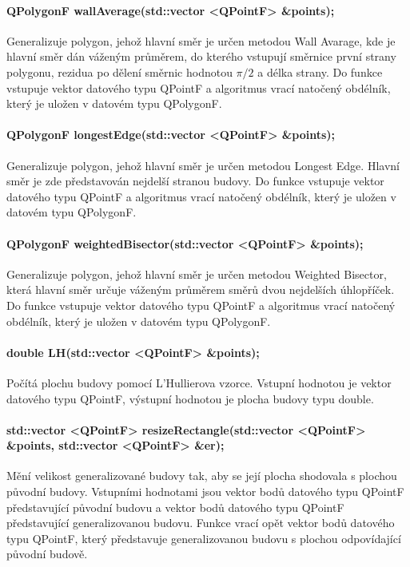 \documentclass[11pt]{article}
\begin{document}
 	\paragraph{QPolygonF wallAverage(std::vector <QPointF> \&points);}
 	Generalizuje polygon, jehož hlavní směr je určen metodou Wall Avarage, kde je hlavní směr dán váženým průměrem, do kterého vstupují směrnice první strany polygonu, rezidua po dělení směrnic hodnotou $\pi/2$ a délka strany. Do funkce vstupuje vektor datového typu QPointF a algoritmus vrací natočený obdélník, který je uložen v datovém typu QPolygonF.
 	
 	\paragraph{QPolygonF longestEdge(std::vector <QPointF> \&points);}
 	Generalizuje polygon, jehož hlavní směr je určen metodou Longest Edge. Hlavní směr je zde představován nejdelší stranou budovy. Do funkce vstupuje vektor datového typu QPointF a algoritmus vrací natočený obdélník, který je uložen v datovém typu QPolygonF.
 	
 	\paragraph{QPolygonF weightedBisector(std::vector <QPointF> \&points);}
 	Generalizuje polygon, jehož hlavní směr je určen metodou Weighted Bisector, která hlavní směr určuje váženým průměrem směrů dvou nejdelších úhlopříček. Do funkce vstupuje vektor datového typu QPointF a algoritmus vrací natočený obdélník, který je uložen v datovém typu QPolygonF.
 	
 	\paragraph{double LH(std::vector <QPointF> \&points);}
 	Počítá plochu budovy pomocí L'Hullierova vzorce. Vstupní hodnotou je vektor datového typu QPoi\-ntF, výstupní hodnotou je plocha budovy typu double.
 	
 	\paragraph{std::vector <QPointF> resizeRectangle(std::vector <QPointF> \&points, \newline std::vector <QPointF> \&er);}
 	Mění velikost generalizované budovy tak, aby se její plocha shodovala s plochou původní budovy. Vstupními hodnotami jsou vektor bodů datového typu QPointF představující původní budovu a vektor bodů datového typu QPointF představující generalizovanou budovu. Funkce vrací opět vektor bodů datového typu QPointF, který představuje generalizovanou budovu s plochou odpovídající původní budově.
	 	
\end{document}
